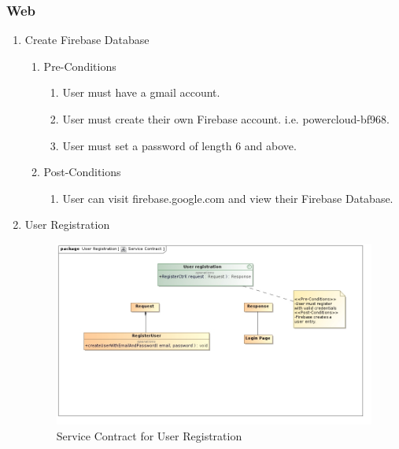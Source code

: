 \documentclass{article}
\begin{document}
	\subsubsection{Web}
	\begin{enumerate}
		\item	Create Firebase Database
		\begin{enumerate}
			\item  Pre-Conditions
			\begin{enumerate}
				\item	User must have a gmail account.
				\item	User must create their own Firebase account. i.e. powercloud-bf968.
				\item	User must set a password of length 6 and above.
			\end{enumerate}
			\item  Post-Conditions		
			\begin{enumerate}
				\item	User can visit firebase.google.com and view their Firebase Database.
			\end{enumerate}
		\end{enumerate}
		\newpage
		\item	User Registration
		
		\begin{figure}[H]
			\includegraphics[width=\textwidth]{images/RegisterServiceContract.jpg}
			\caption{Service Contract for User Registration \label{overflow}}
		\end{figure}
		

\end{enumerate}
\end{document}

